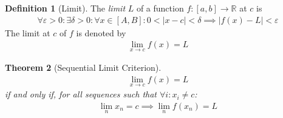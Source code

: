 \documentclass{amsart}
\numberwithin{equation}{section}
\theoremstyle{plain}
\newtheorem{theorem}{Theorem}[section]
\theoremstyle{definition}
\newtheorem{definition}[theorem]{Definition}
\theoremstyle{remark}
\begin{document}
\begin{definition}[Limit]
  The \emph{limit} $L$ of a function $f: [a,b]\to \mathbb{R}$ at $c$ is
  \begin{align}
    \forall \varepsilon> 0: \exists \delta >0: \forall x\in[A,B]:  0<|x-c| < \delta \implies |f(x)- L| < \varepsilon
  \end{align}
  The limit at $c$ of $f$ is denoted by
  \begin{align}
    \lim_{x\to c} f(x) = L 
  \end{align}
\end{definition}

\begin{theorem}[Sequential Limit Criterion]
  \begin{align}
    \lim_{x\to c} f(x) = L
  \end{align}
  if and only if, for all sequences such that $\forall i: x_i \neq c$:
  \begin{align}
    \lim_n x_n = c \implies \lim_n f(x_n) = L
  \end{align}
\end{theorem}
\end{document}
